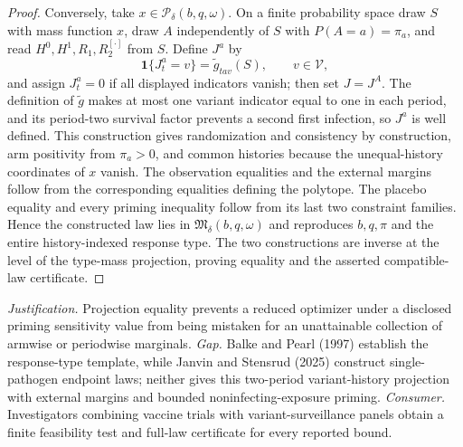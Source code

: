 \documentclass{article}
\begin{document}
\begin{proof}
Conversely, take \(x\in\mathcal P_\delta(b,q,\omega)\).  On a finite probability space draw \(S\) with mass function \(x\), draw \(A\) independently of \(S\) with \(P(A=a)=\pi_a\), and read \(H^0,H^1,R_1,R_2^{[\cdot]}\) from \(S\).  Define \(J^a\) by
\[
\mathbf 1\{J_t^a=v\}=\widetilde g_{tav}(S),\qquad v\in\mathcal V,
\]
and assign \(J_t^a=0\) if all displayed indicators vanish; then set \(J=J^A\).  The definition of \(\widetilde g\) makes at most one variant indicator equal to one in each period, and its period-two survival factor prevents a second first infection, so \(J^a\) is well defined.  This construction gives randomization and consistency by construction, arm positivity from \(\pi_a>0\), and common histories because the unequal-history coordinates of \(x\) vanish.  The observation equalities and the external margins follow from the corresponding equalities defining the polytope.  The placebo equality and every priming inequality follow from its last two constraint families.  Hence the constructed law lies in \(\mathfrak M_\delta(b,q,\omega)\) and reproduces \(b,q,\pi\) and the entire history-indexed response type.  The two constructions are inverse at the level of the type-mass projection, proving equality and the asserted compatible-law certificate.
\end{proof}
\par\smallskip\noindent \textit{Justification.} Projection equality prevents a reduced optimizer under a disclosed priming sensitivity value from being mistaken for an unattainable collection of armwise or periodwise marginals. \textit{Gap.} Balke and Pearl (1997) establish the response-type template, while Janvin and Stensrud (2025) construct single-pathogen endpoint laws; neither gives this two-period variant-history projection with external margins and bounded noninfecting-exposure priming. \textit{Consumer.} Investigators combining vaccine trials with variant-surveillance panels obtain a finite feasibility test and full-law certificate for every reported bound.
\end{document}
